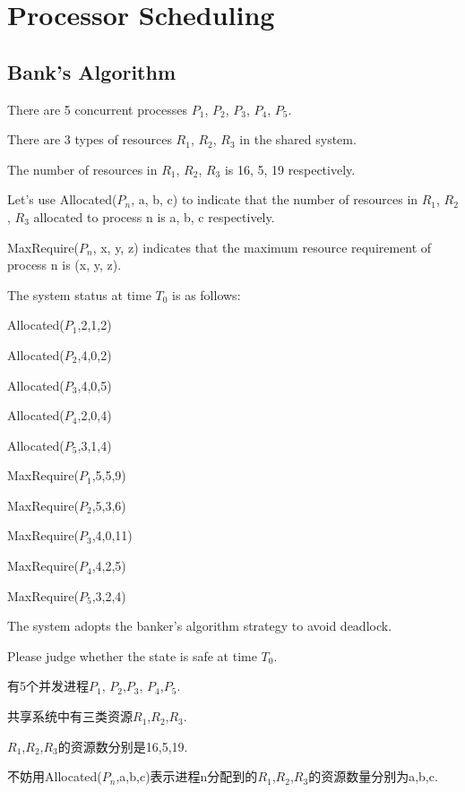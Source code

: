 \documentclass[a4paper]{book}
\begin{document}
\chapter{Processor Scheduling}

\section{Bank's Algorithm}

\begin{greenbox}
There are 5 concurrent processes \(P_1\), \(P_2\), \(P_3\), \(P_4\), \(P_5\).

There are 3 types of resources \(R_1\), \(R_2\), \(R_3\) in the shared system.

The number of resources in \(R_1\), \(R_2\), \(R_3\) is 16, 5, 19 respectively.

Let's use Allocated(\(P_n\), a, b, c) to indicate that the number of resources in \(R_1\), \(R_2\), \(R_3\) allocated to process n is a, b, c respectively.

MaxRequire(\(P_n\), x, y, z) indicates that the maximum resource requirement of process n is (x, y, z).

The system status at time \(T_0\) is as follows:

Allocated(\(P_1\),2,1,2)

Allocated(\(P_2\),4,0,2)

Allocated(\(P_3\),4,0,5)

Allocated(\(P_4\),2,0,4)

Allocated(\(P_5\),3,1,4)

MaxRequire(\(P_1\),5,5,9)

MaxRequire(\(P_2\),5,3,6)

MaxRequire(\(P_3\),4,0,11)

MaxRequire(\(P_4\),4,2,5)

MaxRequire(\(P_5\),3,2,4)

The system adopts the banker's algorithm strategy to avoid deadlock.

Please judge whether the state is safe at time \(T_0\).
\end{greenbox}


有5个并发进程\(P_1\), \(P_2\),\(P_3\), \(P_4\),\(P_5\).

共享系统中有三类资源\(R_1\),\(R_2\),\(R_3\).

\(R_1\),\(R_2\),\(R_3\)的资源数分别是16,5,19.

不妨用Allocated(\(P_n\),a,b,c)表示进程n分配到的\(R_1\),\(R_2\),\(R_3\)的资源数量分别为a,b,c.
\end{document}
